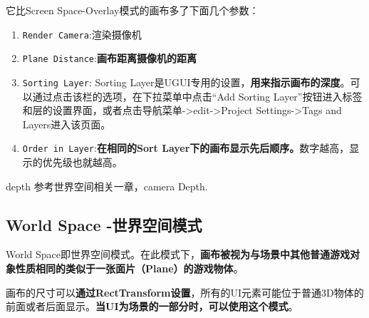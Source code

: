 \documentclass[UTF8,a4paper,12pt]{ctexbook}
\begin{document}
			它比Screen Space-Overlay模式的画布多了下面几个参数：
				\begin{enumerate}[itemindent = 1em]
					\item \verb|Render Camera|:渲染摄像机
					\item \verb|Plane Distance|:\textbf{画布距离摄像机的距离}
					\item \verb|Sorting Layer|: Sorting Layer是UGUI专用的设置，\textbf{用来指示画布的深度}。可以通过点击该栏的选项，在下拉菜单中点击“Add Sorting Layer”按钮进入标签和层的设置界面，或者点击导航菜单->edit->Project Settings->Tags and Layers进入该页面。
					\item \verb|Order in Layer|:\textbf{在相同的Sort Layer下的画布显示先后顺序。}数字越高，显示的优先级也就越高。
				\end{enumerate}
				
				depth 参考世界空间相关一章，camera Depth.
			
		\subsection{World Space -世界空间模式}
			World Space即世界空间模式。在此模式下，\textbf{画布被视为与场景中其他普通游戏对象性质相同的类似于一张面片（Plane）的游戏物体}。
			
			画布的尺寸可以\textbf{通过RectTransform设置}，所有的UI元素可能位于普通3D物体的前面或者后面显示。\textbf{当UI为场景的一部分时，可以使用这个模式}。
			
\end{document}
